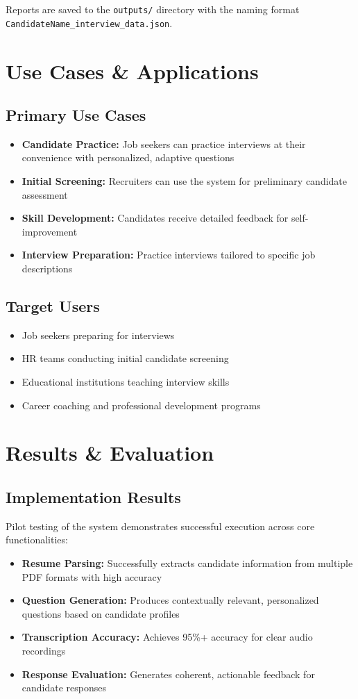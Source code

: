 \documentclass[conference]{IEEEtran}
\begin{document}
Reports are saved to the \texttt{outputs/} directory with the naming format \texttt{CandidateName\_interview\_data.json}.

\section{Use Cases \& Applications}

\subsection{Primary Use Cases}
\begin{itemize}
\item \textbf{Candidate Practice:} Job seekers can practice interviews at their convenience with personalized, adaptive questions
\item \textbf{Initial Screening:} Recruiters can use the system for preliminary candidate assessment
\item \textbf{Skill Development:} Candidates receive detailed feedback for self-improvement
\item \textbf{Interview Preparation:} Practice interviews tailored to specific job descriptions
\end{itemize}

\subsection{Target Users}
\begin{itemize}
\item Job seekers preparing for interviews
\item HR teams conducting initial candidate screening
\item Educational institutions teaching interview skills
\item Career coaching and professional development programs
\end{itemize}

\section{Results \& Evaluation}

\subsection{Implementation Results}
Pilot testing of the system demonstrates successful execution across core functionalities:
\begin{itemize}
\item \textbf{Resume Parsing:} Successfully extracts candidate information from multiple PDF formats with high accuracy
\item \textbf{Question Generation:} Produces contextually relevant, personalized questions based on candidate profiles
\item \textbf{Transcription Accuracy:} Achieves 95\%+ accuracy for clear audio recordings
\item \textbf{Response Evaluation:} Generates coherent, actionable feedback for candidate responses
\end{itemize}
\end{document}
